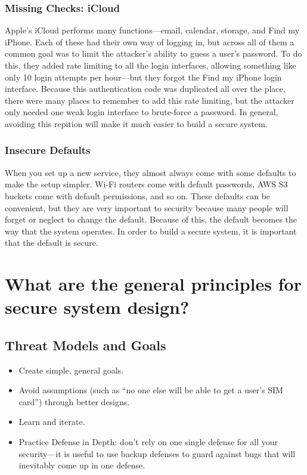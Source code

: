 \subsubsection{Missing Checks: iCloud}
Apple's iCloud performs many functions---email, calendar, storage, and Find my iPhone. Each of these had their own way of logging in, but across all of them a common goal was to limit the attacker's ability to guess a user's password. To do this, they added rate limiting to all the login interfaces, allowing something like only 10 login attempts per hour---but they forgot the Find my iPhone login interface.\autocite{icloud} Because this authentication code was duplicated all over the place, there were many places to remember to add this rate limiting, but the attacker only needed one weak login interface to brute-force a password. In general, avoiding this repition will make it much easier to build a secure system.

\subsubsection{Insecure Defaults}
When you set up a new service, they almost always come with some defaults to make the setup simpler. Wi-Fi routers come with default passwords, AWS S3 buckets come with default permissions, and so on. These defaults can be convenient, but they are very important to security because many people will forget or neglect to change the default. Because of this, the default becomes the way that the system operates. In order to build a secure system, it is important that the default is secure.



\section{What are the general principles for secure system design?}
\subsection{Threat Models and Goals}
\begin{itemize}
	\item Create simple, general goals.
	\item Avoid assumptions (such as ``no one else will be able to get a user's SIM card'') through better designs.
	\item Learn and iterate.
	\item Practice Defense in Depth: don't rely on one single defense for all your security---it is useful to use backup defenses to guard against bugs that will inevitably come up in one defense.
\end{itemize}

